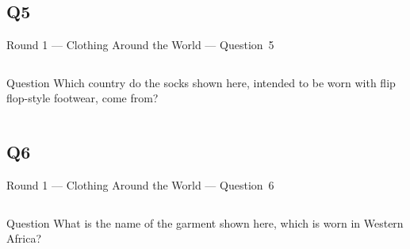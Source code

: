 \documentclass[11pt]{beamer}
\begin{document}
\subsection*{Q5}
\begin{frame}[t]{Round 1 --- Clothing Around the World --- \mbox{Question 5}}
\vspace{-0.5em}
\begin{columns}[T,totalwidth=\linewidth]
\begin{column}{0.37\linewidth}
\begin{block}{Question}
Which country do the socks shown here, intended to be worn with flip flop-style footwear, come from?
\end{block}
\end{column}
\begin{column}{0.62\linewidth}
\begin{center}
\texttt{[image: \{Images/tabi]}.jpg}
\end{center}
\end{column}
\end{columns}
\end{frame}
\subsection*{Q6}
\begin{frame}[t]{Round 1 --- Clothing Around the World --- \mbox{Question 6}}
\vspace{-0.5em}
\begin{columns}[T,totalwidth=\linewidth]
\begin{column}{0.37\linewidth}
\begin{block}{Question}
What is the name of the garment shown here, which is worn in Western Africa?
\end{block}
\end{column}
\begin{column}{0.62\linewidth}
\begin{center}
\texttt{[image: \{Images/dashiki]}.jpg}
\end{center}
\end{column}
\end{columns}
\end{frame}
\end{document}
